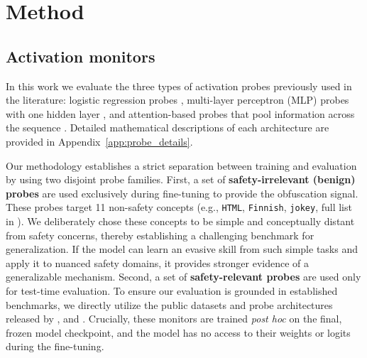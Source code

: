 \documentclass{article} %
\begin{document}
\section{Method}


\subsection{Activation monitors} \label{sec:probes}

In this work we evaluate the three types of activation probes previously used in the literature: logistic regression probes \citep{alain2016understanding, goldowsky2025detecting}, multi-layer perceptron (MLP) probes with one hidden layer \citep{bailey2024obfuscated}, and attention-based probes that pool information across the sequence \citep{kantamneni2025sparseautoencodersuseful, mckenzie2025detectinghighstakesinteractionsactivation}. Detailed mathematical descriptions of each architecture are provided in Appendix~\ref{app:probe_details}.

Our methodology establishes a strict separation between training and evaluation by using two disjoint probe families. First, a set of \textbf{safety-irrelevant (benign) probes} are used exclusively during fine-tuning to provide the obfuscation signal. These probes target 11 non-safety concepts (e.g., \texttt{HTML}, \texttt{Finnish}, \texttt{jokey}, full list in ). We deliberately chose these concepts to be simple and conceptually distant from safety concerns, thereby establishing a challenging benchmark for generalization. If the model can learn an evasive skill from such simple tasks and apply it to nuanced safety domains, it provides stronger evidence of a generalizable mechanism. Second, a set of \textbf{safety-relevant probes} are used only for test-time evaluation. To ensure our evaluation is grounded in established benchmarks, we directly utilize the public datasets and probe architectures released by \citet{bailey2024obfuscated},  \citet{goldowsky2025detecting} and \citet{cundy2025preferencelearningliedetectors}. Crucially, these monitors are trained \emph{post hoc} on the final, frozen model checkpoint, and the model has no access to their weights or logits during the fine-tuning.
\end{document}
